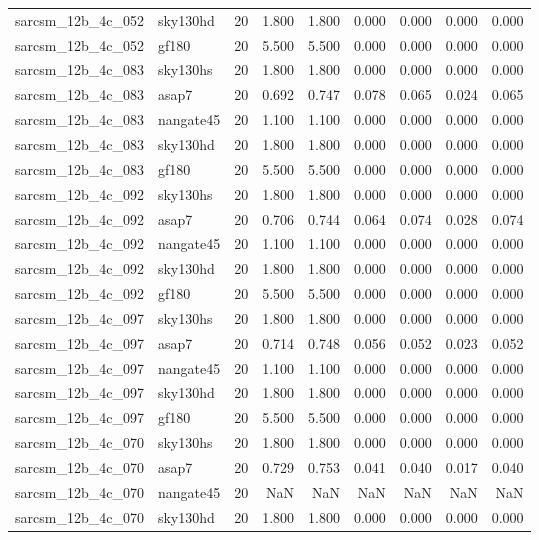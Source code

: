\begin{tabular}{llrrrrrrr}
sarcsm\_12b\_4c\_052 & sky130hd & 20 & 1.800 & 1.800 & 0.000 & 0.000 & 0.000 & 0.000 \\
sarcsm\_12b\_4c\_052 & gf180 & 20 & 5.500 & 5.500 & 0.000 & 0.000 & 0.000 & 0.000 \\
sarcsm\_12b\_4c\_083 & sky130hs & 20 & 1.800 & 1.800 & 0.000 & 0.000 & 0.000 & 0.000 \\
sarcsm\_12b\_4c\_083 & asap7 & 20 & 0.692 & 0.747 & 0.078 & 0.065 & 0.024 & 0.065 \\
sarcsm\_12b\_4c\_083 & nangate45 & 20 & 1.100 & 1.100 & 0.000 & 0.000 & 0.000 & 0.000 \\
sarcsm\_12b\_4c\_083 & sky130hd & 20 & 1.800 & 1.800 & 0.000 & 0.000 & 0.000 & 0.000 \\
sarcsm\_12b\_4c\_083 & gf180 & 20 & 5.500 & 5.500 & 0.000 & 0.000 & 0.000 & 0.000 \\
sarcsm\_12b\_4c\_092 & sky130hs & 20 & 1.800 & 1.800 & 0.000 & 0.000 & 0.000 & 0.000 \\
sarcsm\_12b\_4c\_092 & asap7 & 20 & 0.706 & 0.744 & 0.064 & 0.074 & 0.028 & 0.074 \\
sarcsm\_12b\_4c\_092 & nangate45 & 20 & 1.100 & 1.100 & 0.000 & 0.000 & 0.000 & 0.000 \\
sarcsm\_12b\_4c\_092 & sky130hd & 20 & 1.800 & 1.800 & 0.000 & 0.000 & 0.000 & 0.000 \\
sarcsm\_12b\_4c\_092 & gf180 & 20 & 5.500 & 5.500 & 0.000 & 0.000 & 0.000 & 0.000 \\
sarcsm\_12b\_4c\_097 & sky130hs & 20 & 1.800 & 1.800 & 0.000 & 0.000 & 0.000 & 0.000 \\
sarcsm\_12b\_4c\_097 & asap7 & 20 & 0.714 & 0.748 & 0.056 & 0.052 & 0.023 & 0.052 \\
sarcsm\_12b\_4c\_097 & nangate45 & 20 & 1.100 & 1.100 & 0.000 & 0.000 & 0.000 & 0.000 \\
sarcsm\_12b\_4c\_097 & sky130hd & 20 & 1.800 & 1.800 & 0.000 & 0.000 & 0.000 & 0.000 \\
sarcsm\_12b\_4c\_097 & gf180 & 20 & 5.500 & 5.500 & 0.000 & 0.000 & 0.000 & 0.000 \\
sarcsm\_12b\_4c\_070 & sky130hs & 20 & 1.800 & 1.800 & 0.000 & 0.000 & 0.000 & 0.000 \\
sarcsm\_12b\_4c\_070 & asap7 & 20 & 0.729 & 0.753 & 0.041 & 0.040 & 0.017 & 0.040 \\
sarcsm\_12b\_4c\_070 & nangate45 & 20 & NaN & NaN & NaN & NaN & NaN & NaN \\
sarcsm\_12b\_4c\_070 & sky130hd & 20 & 1.800 & 1.800 & 0.000 & 0.000 & 0.000 & 0.000 \\

\end{tabular}
